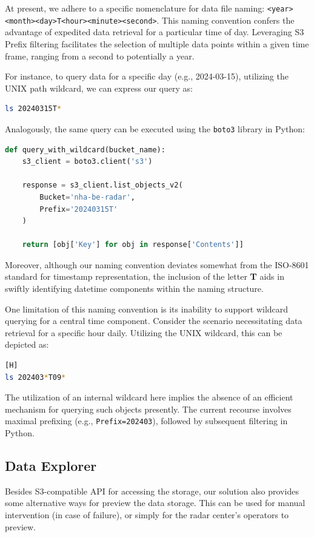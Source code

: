 At present, we adhere to a specific nomenclature for data file naming:
\texttt{<year><month><day>T<hour><minute><second>}. This naming convention
confers the advantage of expedited data retrieval for a particular time of day.
Leveraging S3 Prefix filtering facilitates the selection of multiple data points
within a given time frame, ranging from a second to potentially a year.

For instance, to query data for a specific day (e.g., 2024-03-15), utilizing the
UNIX path wildcard, we can express our query as:

\begin{lstlisting}[language=sh]
ls 20240315T*
\end{lstlisting}

\newpage

Analogously, the same query can be executed using the \texttt{boto3} library in
Python:

\begin{lstlisting}[language=Python, caption={Querying data in 2024-03-15}]
def query_with_wildcard(bucket_name):
    s3_client = boto3.client('s3')
    
    response = s3_client.list_objects_v2(
        Bucket='nha-be-radar',
        Prefix='20240315T'
    )
        
    return [obj['Key'] for obj in response['Contents']]
\end{lstlisting}

Moreover, although our naming convention deviates somewhat from the ISO-8601
standard for timestamp representation, the inclusion of the letter \textbf{T}
aids in swiftly identifying datetime components within the naming structure.

One limitation of this naming convention is its inability to support wildcard
querying for a central time component. Consider the scenario necessitating data
retrieval for a specific hour daily. Utilizing the UNIX wildcard, this can be
depicted as:

\begin{lstlisting}[language=sh][H]
ls 202403*T09*
\end{lstlisting}

The utilization of an internal wildcard here implies the absence of an efficient
mechanism for querying such objects presently. The current recourse involves
maximal prefixing (e.g., \texttt{Prefix=202403}), followed by subsequent
filtering in Python.

\subsection{Data Explorer}
Besides S3-compatible API for accessing the storage, our solution also provides some alternative ways
for preview the data storage. This can be used for manual intervention (in case of failure), or simply for
the radar center's operators to preview.

